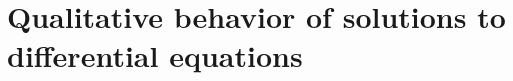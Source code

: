 \section{Qualitative behavior of solutions to differential equations} \label{S:7.2.Qualitative}



\newpage



\newpage



\newpage

\clearpage
